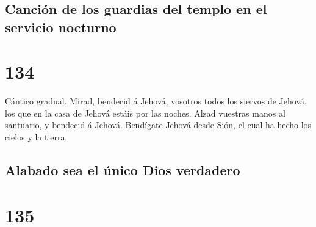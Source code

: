 \hypertarget{canciuxf3n-de-los-guardias-del-templo-en-el-servicio-nocturno}{%
\subsection{Canción de los guardias del templo en el servicio
nocturno}\label{canciuxf3n-de-los-guardias-del-templo-en-el-servicio-nocturno}}

\hypertarget{section-133}{%
\section{134}\label{section-133}}

 Cántico gradual. Mirad, bendecid á Jehová, vosotros todos
los siervos de Jehová, los que en la casa de Jehová estáis por las
noches.  Alzad vuestras manos al santuario, y bendecid á
Jehová.  Bendígate Jehová desde Sión, el cual ha hecho los
cielos y la tierra.

\hypertarget{alabado-sea-el-uxfanico-dios-verdadero}{%
\subsection{Alabado sea el único Dios
verdadero}\label{alabado-sea-el-uxfanico-dios-verdadero}}

\hypertarget{section-134}{%
\section{135}\label{section-134}}

